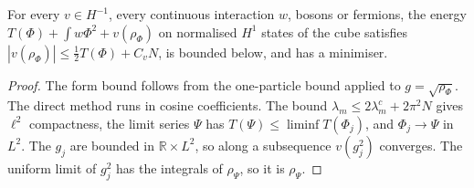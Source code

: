 \begin{theorem}
  \label{thm:neu_gs_N}
  \leanok
  For every $v\in H^{-1}$, every continuous interaction $w$, bosons or fermions, the energy
  $T(\Phi)+\int w\Phi^2+v(\rho_\Phi)$ on normalised $H^1$ states of the cube satisfies
  $|v(\rho_\Phi)|\le\frac12T(\Phi)+C_vN$, is bounded below, and has a minimiser.
\end{theorem}
\begin{proof}
  \leanok
  The form bound follows from the one-particle bound applied to $g=\sqrt{\rho_\Phi}$. The direct method runs in cosine
  coefficients. The bound $\lambda_m\le2\lambda^c_m+2\pi^2N$ gives $\ell^2$ compactness, the limit series $\Psi$ has
  $T(\Psi)\le\liminf T(\Phi_j)$, and $\Phi_j\to\Psi$ in $L^2$. The $g_j$ are bounded in $\mathbb R\times L^2$, so along a
  subsequence $v(g_j^2)$ converges. The uniform limit of $g_j^2$ has the integrals of $\rho_\Psi$, so it is $\rho_\Psi$.
\end{proof}

